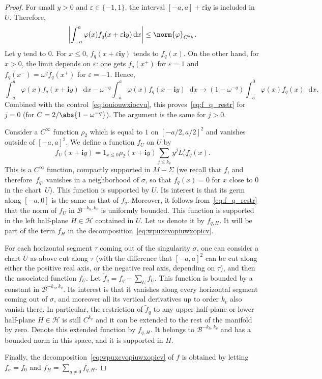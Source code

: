 \documentclass[10pt]{amsart}
\newcommand{\boH}{\mathcal{H}}
\newcommand{\boB}{\mathcal{B}}
\newcommand{\dd}{\mathop{}\!\mathrm{d}}
\newcommand{\ic}{\mathbf{i}}
\newcommand{\absgg}[1]{\biggl \lvert#1\biggr\rvert}
\let\epsilon\varepsilon
\let\phi\varphi
\theoremstyle{definition}
\numberwithin{equation}{section}
\begin{document}
\begin{proof}
For small $y>0$ and $\epsilon \in \{-1, 1\}$, the interval $[-a,a]+\epsilon
\ic y$ is included in $U$. Therefore,
\begin{equation}
\label{eq:iouiouwxiocvu}
\absgg{\int_{-a}^a \phi(x) f_q(x+\epsilon \ic y) \dd x} \leq \norm{\phi}_{C^{k_h}}.
\end{equation}
Let $y$ tend to $0$. For $x \leq 0$, $f_q(x+\epsilon \ic y)$ tends to
$f_q(x)$. On the other hand, for $x>0$, the limit depends on $\epsilon$: one
gets $f_q(x^+)$ for $\epsilon=1$ and $f_q(x^-) = \omega^q f_q(x^+)$ for
$\epsilon = -1$. Hence,
\begin{equation*}
\int_{-a}^a \phi(x) f_q(x+\ic y) \dd x - \omega^{-q} \int_{-a}^a \phi(x) f_q(x-\ic y) \dd x
\to (1-\omega^{-q}) \int_{-a}^0 \phi(x) f_q(x) \dd x.
\end{equation*}
Combined with the control~\eqref{eq:iouiouwxiocvu}, this
proves~\eqref{eq:f_q_restr} for $j=0$ (for $C=2/\abs{1-\omega^{-q}}$). The
argument is the same for $j>0$.

Consider a $C^\infty$ function $\rho_2$ which is equal to $1$ on $[-a/2,
a/2]^2$ and vanishes outside of $[-a,a]^2$. We define a function $f_U$ on $U$
by
\[
f_U(x+\ic y) = 1_{x\leq 0} \rho_2(x+\ic y) \sum_{j\leq k_v} y^j L_v^j
f_q(x).
\]
This is a $C^\infty$ function, compactly supported in $M-\Sigma$ (we
recall that $f$, and therefore~$f_q$, vanishes in a neighborhood of $\sigma$,
so that $f_q(x)=0$ for $x$ close to $0$ in the chart~$U$). This function is
supported by $U$. Its interest is that its germ along $[-a,0]$ is the same as
that of $f_q$. Moreover, it follows from~\eqref{eq:f_q_restr} that the norm
of $f_U$ in $\boB^{-k_h, k_v}$ is uniformly bounded. This function is
supported in the left half-plane $H \in \boH$ contained in $U$. Let us denote
it by $f_{q, H}$. It will be part of the term $f_H$ in the
decomposition~\eqref{eq:wpuxcvopiuwxopicv}.

For each horizontal segment $\tau$ coming out of the singularity $\sigma$,
one can consider a chart $U$ as above cut along $\tau$ (with the difference
that $[-a,a]^2$ can be cut along either the positive real axis, or the
negative real axis, depending on $\tau$), and then the associated function
$f_U$. Let $\tilde f_q = f_q -\sum_U f_U$. This function is bounded by a
constant in $\boB^{-k_h, k_v}$. Its interest is that it vanishes along every
horizontal segment coming out of $\sigma$, and moreover all its vertical
derivatives up to order $k_v$ also vanish there. In particular, the
restriction of $\tilde f_q$ to any upper half-plane or lower half-plane $H\in
\boH$ is still $C^{k_v}$ and it can be extended to the rest of the manifold
by zero. Denote this extended function by $f_{q, H}$. It belongs to
$\boB^{-k_h, k_v}$ and has a bounded norm in this space, and it is supported
in $H$.

Finally, the decomposition~\eqref{eq:wpuxcvopiuwxopicv} of $f$ is obtained by
letting $f_\sigma=f_0$ and $f_H = \sum_{q\neq 0} f_{q,H}$.
\end{proof}
\end{document}
